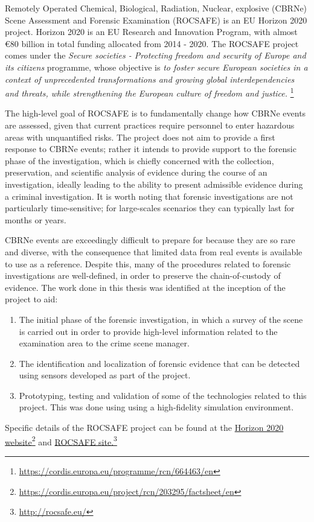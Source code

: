 Remotely Operated Chemical, Biological, Radiation, Nuclear, explosive (CBRNe) Scene Assessment and Forensic Examination (ROCSAFE) is an EU Horizon 2020 project. Horizon 2020 is an EU Research and Innovation Program, with almost €80 billion in total funding allocated from 2014 - 2020. The ROCSAFE project comes under the \textit{Secure societies - Protecting freedom and security of Europe and its citizens} programme, whose objective is \textit{to foster secure European societies in a context of unprecedented transformations and growing global interdependencies and threats, while strengthening the European culture of freedom and justice.}
\href{https://cordis.europa.eu/programme/rcn/664463/en}{}\footnote{\href {https://cordis.europa.eu/programme/rcn/664463/en}{https://cordis.europa.eu/programme/rcn/664463/en}}

The high-level goal of ROCSAFE is to fundamentally change how CBRNe events are assessed, given that current practices require personnel to enter hazardous areas with unquantified risks. The project does not aim to provide a first response to CBRNe events; rather it intends to provide support to the forensic phase of the investigation, which is chiefly concerned with the collection, preservation, and scientific analysis of evidence during the course of an investigation, ideally leading to the ability to present admissible evidence during a criminal investigation. It is worth noting that forensic investigations are not particularly time-sensitive; for large-scales scenarios they can typically last for months or years.\par
CBRNe events are exceedingly difficult to prepare for because they are so rare and diverse, with the consequence that limited data from real events is available to use as a reference. Despite this, many of the procedures related to forensic investigations are well-defined, in order to preserve the chain-of-custody of evidence. The work done in this thesis was identified at the inception of the project to aid: 
\begin{enumerate}
    \item The initial phase of the forensic investigation, in which a survey of the scene is carried out in order to provide high-level information related to the examination area to the crime scene manager.
    \item The identification and localization of forensic evidence that can be detected using sensors developed as part of the project.
    \item Prototyping, testing and validation of some of the technologies related to this project. This was done using using a high-fidelity simulation environment.
\end{enumerate}



Specific details of the ROCSAFE project can be found at the \href{https://cordis.europa.eu/project/rcn/203295/factsheet/en}{Horizon 2020 website}\footnote{\href {https://cordis.europa.eu/project/rcn/203295/factsheet/en}{https://cordis.europa.eu/project/rcn/203295/factsheet/en}} 
and 
\href{http://rocsafe.eu/}{ROCSAFE site.}\footnote{\href {http://rocsafe.eu/}{http://rocsafe.eu/}}